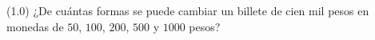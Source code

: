 (1.0) ¿De cuántas formas se puede cambiar un billete de cien mil pesos en monedas de $50$, $100$, $200$, $500$ y $1000$ pesos?
